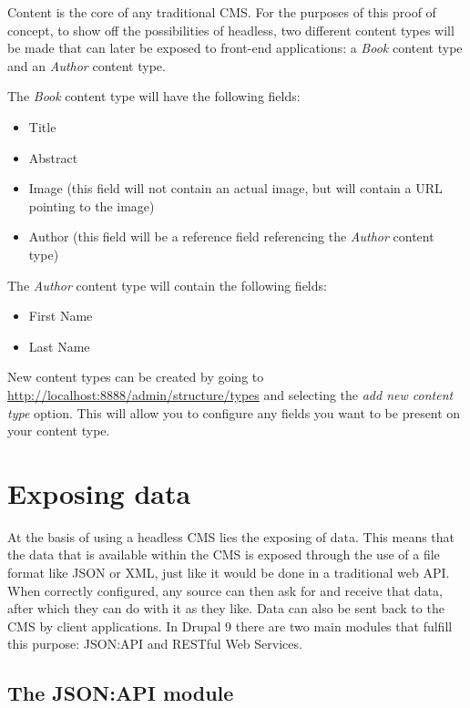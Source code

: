 Content is the core of any traditional CMS. For the purposes of this proof of concept, to show off the possibilities of headless, two different content types will be made that can later be exposed to front-end applications: a \emph{Book} content type and an \emph{Author} content type.

The \emph{Book} content type will have the following fields: 

\begin{itemize}
	\item Title
	\item Abstract
	\item Image (this field will not contain an actual image, but will contain a URL pointing to the image)
	\item Author (this field will be a reference field referencing the \emph{Author} content type)
\end{itemize}

The \emph{Author} content type will contain the following fields:

\begin{itemize}
	\item First Name
	\item Last Name
\end{itemize}

New content types can be created by going to \url{http://localhost:8888/admin/structure/types} and selecting the \emph{add new content type} option. This will allow you to configure any fields you want to be present on your content type.


\section{Exposing data}

At the basis of using a headless CMS lies the exposing of data. This means that the data that is available within the CMS is exposed through the use of a file format like JSON or XML, just like it would be done in a traditional web API. When correctly configured, any source can then ask for and receive that data, after which they can do with it as they like. Data can also be sent back to the CMS by client applications. In Drupal 9 there are two main modules that fulfill this purpose: JSON:API and RESTful Web Services.

\subsection{The JSON:API module}

